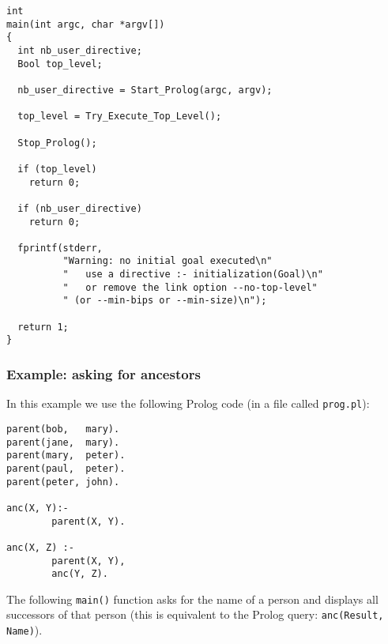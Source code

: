 \begin{Indentation}
\begin{verbatim}
int
main(int argc, char *argv[])
{
  int nb_user_directive;
  Bool top_level;

  nb_user_directive = Start_Prolog(argc, argv);

  top_level = Try_Execute_Top_Level();

  Stop_Prolog();

  if (top_level)
    return 0;

  if (nb_user_directive)
    return 0;

  fprintf(stderr,
          "Warning: no initial goal executed\n"
          "   use a directive :- initialization(Goal)\n"
          "   or remove the link option --no-top-level"
          " (or --min-bips or --min-size)\n");

  return 1;
}
\end{verbatim}
\end{Indentation}

\subsubsection{Example: asking for ancestors}

In this example we use the following Prolog code (in a file called 
\texttt{prog.pl}):

\begin{Indentation}
\begin{verbatim}
parent(bob,   mary).
parent(jane,  mary).
parent(mary,  peter).
parent(paul,  peter).
parent(peter, john).

anc(X, Y):-
        parent(X, Y).

anc(X, Z) :-
        parent(X, Y),
        anc(Y, Z).
\end{verbatim}
\end{Indentation}

The following \texttt{main()} function asks for the name of a person and
displays all successors of that person (this is equivalent to the Prolog
query: \texttt{anc(Result, Name)}).

